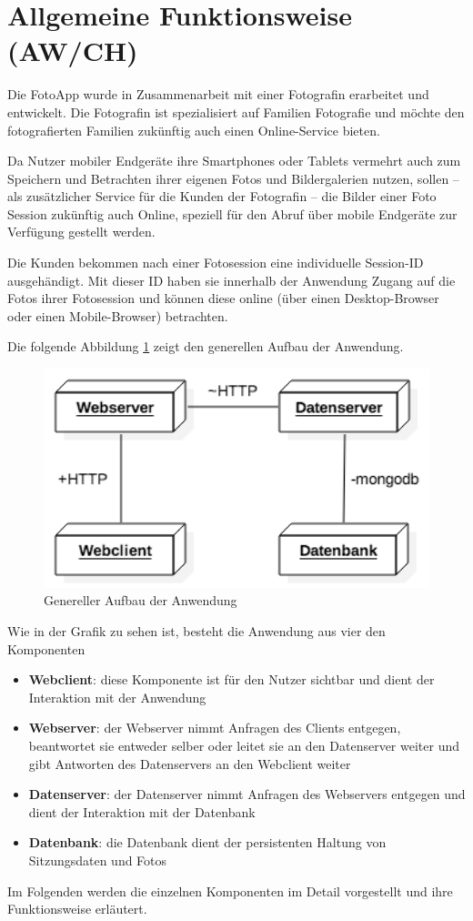 \section{Allgemeine Funktionsweise (AW/CH)}
Die FotoApp wurde in Zusammenarbeit mit einer Fotografin erarbeitet und entwickelt. Die Fotografin ist spezialisiert auf Familien Fotografie und möchte den fotografierten Familien zukünftig auch einen Online-Service bieten. 

Da Nutzer mobiler Endgeräte ihre Smartphones oder Tablets vermehrt auch zum Speichern und Betrachten ihrer eigenen Fotos und Bildergalerien nutzen, sollen – als zusätzlicher Service für die Kunden der Fotografin – die Bilder einer Foto Session zukünftig auch Online, speziell für den Abruf über mobile Endgeräte zur Verfügung gestellt werden.   

Die Kunden bekommen nach einer Fotosession eine individuelle Session-ID ausgehändigt. Mit dieser ID haben sie innerhalb der Anwendung Zugang auf die Fotos ihrer Fotosession und können diese online (über einen Desktop-Browser oder einen Mobile-Browser) betrachten.

Die folgende Abbildung \ref{fig_genereller_aufbau} zeigt den generellen Aufbau der Anwendung.

\begin{figure}[h]
	\centering
	\includegraphics[width=14cm]{bilder/genereller_aufbau}
	\caption{Genereller Aufbau der Anwendung}
	\label{fig_genereller_aufbau}
\end{figure}

Wie in der Grafik zu sehen ist, besteht die Anwendung aus vier den Komponenten
\begin{itemize}
	\item \textbf{Webclient}: diese Komponente ist für den Nutzer sichtbar und dient der Interaktion mit der Anwendung
	\item \textbf{Webserver}: der Webserver nimmt Anfragen des Clients entgegen, beantwortet sie entweder selber oder leitet sie an den Datenserver weiter und gibt Antworten des Datenservers an den Webclient weiter
	\item \textbf{Datenserver}: der Datenserver nimmt Anfragen des Webservers entgegen und dient der Interaktion mit der Datenbank
	\item \textbf{Datenbank}: die Datenbank dient der persistenten Haltung von Sitzungsdaten und Fotos
\end{itemize}

Im Folgenden werden die einzelnen Komponenten im Detail vorgestellt und ihre Funktionsweise erläutert.
